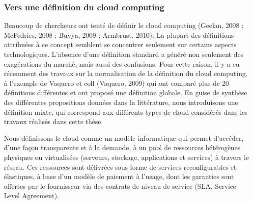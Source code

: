 \subsubsection{Vers une définition du cloud computing }
Beaucoup de chercheurs ont tenté de définir le cloud computing (Geelan, 2008 ; McFedries, 2008 ; Buyya, 2009 ; Armbrust, 2010). La plupart des définitions attribuées à ce concept semblent se concentrer seulement sur certains aspects technologiques. L'absence d'une définition standard a généré non seulement des exagérations du marché, mais aussi des confusions. Pour cette raison, il y a eu récemment des travaux sur la normalisation de la définition du cloud computing, à l'exemple de Vaquero et coll (Vaquero, 2009) qui ont comparé plus de 20 définitions différentes et ont proposé une définition globale.  En guise de synthèse des différentes propositions données dans la littérature, nous introduisons une définition mixte, qui correspond aux différents types de cloud considérés dans les travaux réalisés dans cette thèse.

  Nous définissons le cloud comme un modèle informatique qui permet d’accéder, d’une façon transparente et à la demande, à un pool de ressources hétérogènes physiques ou virtualisées (serveurs, stockage, applications et services) à travers le réseau. Ces ressources sont délivrées sous forme de services reconfigurables et élastiques, à base d’un modèle de paiement à l’usage, dont les garanties sont offertes par le fournisseur via des contrats de niveau de service (SLA, Service Level Agreement).     

